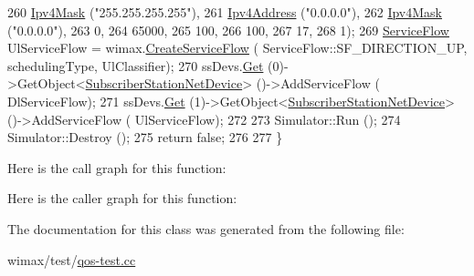 \begin{DoxyCode}
260                                      \hyperlink{classns3_1_1Ipv4Mask}{Ipv4Mask} (\textcolor{stringliteral}{"255.255.255.255"}),
261                                      \hyperlink{classns3_1_1Ipv4Address}{Ipv4Address} (\textcolor{stringliteral}{"0.0.0.0"}),
262                                      \hyperlink{classns3_1_1Ipv4Mask}{Ipv4Mask} (\textcolor{stringliteral}{"0.0.0.0"}),
263                                      0,
264                                      65000,
265                                      100,
266                                      100,
267                                      17,
268                                      1);
269   \hyperlink{classns3_1_1ServiceFlow}{ServiceFlow} UlServiceFlow = wimax.\hyperlink{classns3_1_1WimaxHelper_aed0c1ffdcd62234c14965f899efc88c1}{CreateServiceFlow} (
      ServiceFlow::SF\_DIRECTION\_UP, schedulingType, UlClassifier);
270   ssDevs.\hyperlink{classns3_1_1NetDeviceContainer_a677d62594b5c9d2dea155cc5045f4d0b}{Get} (0)->GetObject<\hyperlink{classns3_1_1SubscriberStationNetDevice}{SubscriberStationNetDevice}> ()->AddServiceFlow (
      DlServiceFlow);
271   ssDevs.\hyperlink{classns3_1_1NetDeviceContainer_a677d62594b5c9d2dea155cc5045f4d0b}{Get} (1)->GetObject<\hyperlink{classns3_1_1SubscriberStationNetDevice}{SubscriberStationNetDevice}> ()->AddServiceFlow (
      UlServiceFlow);
272 
273   Simulator::Run ();
274   Simulator::Destroy ();
275   \textcolor{keywordflow}{return} \textcolor{keyword}{false};
276 
277 \}
\end{DoxyCode}


Here is the call graph for this function\+:




Here is the caller graph for this function\+:




The documentation for this class was generated from the following file\+:\begin{DoxyCompactItemize}
\item 
wimax/test/\hyperlink{qos-test_8cc}{qos-\/test.\+cc}\end{DoxyCompactItemize}
